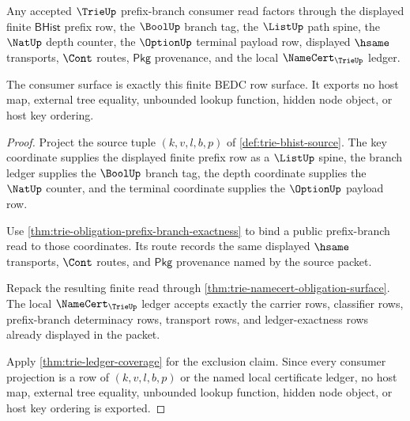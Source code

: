 \begin{theorem}
\label{thm:trie-prefix-branch-consumer-exhaustion}
Any accepted $\TrieUp$ prefix-branch consumer read factors through the displayed
finite $\mathsf{BHist}$ prefix row, the $\BoolUp$ branch tag, the $\ListUp$ path
spine, the $\NatUp$ depth counter, the $\OptionUp$ terminal payload row,
displayed $\hsame$ transports, $\Cont$ routes, $\mathsf{Pkg}$ provenance, and
the local $\NameCert_{\TrieUp}$ ledger.

The consumer surface is exactly this finite BEDC row surface. It exports no
host map, external tree equality, unbounded lookup function, hidden node object,
or host key ordering.
\end{theorem}
\begin{proof}
Project the source tuple $(k,v,l,b,p)$ of
\autoref{def:trie-bhist-source}. The key coordinate supplies the displayed
finite prefix row as a $\ListUp$ spine, the branch ledger supplies the
$\BoolUp$ branch tag, the depth coordinate supplies the $\NatUp$ counter, and
the terminal coordinate supplies the $\OptionUp$ payload row.

Use \autoref{thm:trie-obligation-prefix-branch-exactness} to bind a public
prefix-branch read to those coordinates. Its route records the same displayed
$\hsame$ transports, $\Cont$ routes, and $\mathsf{Pkg}$ provenance named by the
source packet.

Repack the resulting finite read through
\autoref{thm:trie-namecert-obligation-surface}. The local $\NameCert_{\TrieUp}$
ledger accepts exactly the carrier rows, classifier rows, prefix-branch
determinacy rows, transport rows, and ledger-exactness rows already displayed
in the packet.

Apply \autoref{thm:trie-ledger-coverage} for the exclusion claim. Since every
consumer projection is a row of $(k,v,l,b,p)$ or the named local certificate
ledger, no host map, external tree equality, unbounded lookup function, hidden
node object, or host key ordering is exported.
\end{proof}

